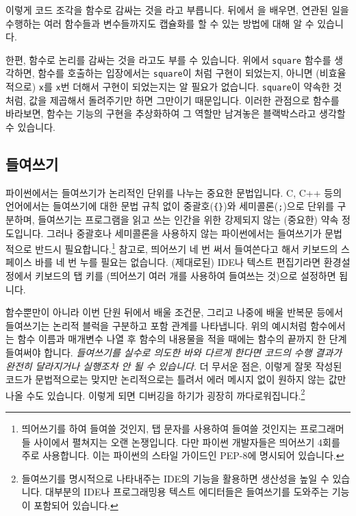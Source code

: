 \documentclass[../main.tex]{subfiles}
\begin{document}
이렇게 코드 조각을 함수로 감싸는 것을 라고 부릅니다.
뒤에서 을 배우면, 연관된 일을 수행하는 여러 함수들과 변수들까지도 캡슐화를 할 수 있는 방법에 대해 알 수 있습니다.

한편, 함수로 논리를 감싸는 것을 라고도 부를 수 있습니다.
위에서 \verb/square/ 함수를 생각하면, 함수를 호출하는 입장에서는 \verb/square/이 처럼 구현이 되었는지, 아니면 (비효율적으로) \verb/x/를 \verb/x/번 더해서 구현이 되었는지는 알 필요가 없습니다.
\verb/square/이 약속한 것처럼, 값을 제곱해서 돌려주기만 하면 그만이기 때문입니다.
이러한 관점으로 함수를 바라보면, 함수는 기능의 구현을 추상화하여 그 역할만 남겨놓은 블랙박스라고 생각할 수 있습니다.

\subsection{들여쓰기}
파이썬에서는 들여쓰기가 논리적인 단위를 나누는 중요한 문법입니다.
C, C++ 등의 언어에서는 들여쓰기에 대한 문법 규칙 없이 중괄호(\verb|{}|)와
세미콜론(\verb|;|)으로 단위를 구분하며, 들여쓰기는 프로그램을 읽고 쓰는 인간을 위한 강제되지 않는 (중요한) 약속 정도입니다.
그러나 중괄호나 세미콜론을 사용하지 않는 파이썬에서는 들여쓰기가 문법적으로
반드시 필요합니다.\footnote{띄어쓰기를 하여 들여쓸 것인지, 탭 문자를 사용하여
들여쓸 것인지는 프로그래머들 사이에서 펼쳐지는 오랜 논쟁입니다. 다만 파이썬 개발자들은 띄어쓰기 4회를 주로 사용합니다. 이는 파이썬의 스타일 가이드인 PEP-8에 명시되어 있습니다.}
참고로, 띄어쓰기 네 번 써서 들여쓴다고 해서 키보드의 스페이스 바를 네 번 누를 필요는 없습니다.
(제대로된) IDE나 텍스트 편집기라면 환경설정에서 키보드의 탭 키를  (띄어쓰기 여러 개를 사용하여 들여쓰는 것)으로 설정하면 됩니다.

함수뿐만이 아니라 이번 단원 뒤에서 배울 조건문, 그리고 나중에 배울 반복문 등에서 들여쓰기는
논리적 블럭을 구분하고 포함 관계를 나타냅니다.
위의 예시처럼 함수에서는 함수 이름과 매개변수 나열 후 함수의 내용물을 적을 때에는 함수의 끝까지 한 단계 들여써야 합니다.
\emph{들여쓰기를 실수로 의도한 바와 다르게 한다면 코드의 수행 결과가 완전히 달라지거나 실행조차 안 될 수 있습니다.}
더 무서운 점은, 이렇게 잘못 작성된 코드가 문법적으로는 맞지만 논리적으로는 틀려서 에러 메시지 없이 원하지 않는 값만 나올 수도 있습니다.
이렇게 되면 디버깅을 하기가 굉장히 까다로워집니다.\footnote{들여쓰기를 명시적으로 나타내주는 IDE의 기능을 활용하면 생산성을 높일 수 있습니다.  대부분의 IDE나 프로그래밍용 텍스트 에디터들은 들여쓰기를 도와주는 기능이 포함되어 있습니다.}
\end{document}
